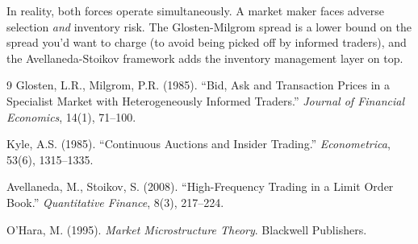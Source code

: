 \documentclass[11pt]{article}
\begin{document}
In reality, both forces operate simultaneously. A market maker faces adverse selection \emph{and} inventory risk. The Glosten-Milgrom spread is a lower bound on the spread you'd want to charge (to avoid being picked off by informed traders), and the Avellaneda-Stoikov framework adds the inventory management layer on top.

\begin{thebibliography}{9}
 Glosten, L.R., Milgrom, P.R. (1985). ``Bid, Ask and Transaction Prices in a Specialist Market with Heterogeneously Informed Traders.'' \textit{Journal of Financial Economics}, 14(1), 71--100.

 Kyle, A.S. (1985). ``Continuous Auctions and Insider Trading.'' \textit{Econometrica}, 53(6), 1315--1335.

 Avellaneda, M., Stoikov, S. (2008). ``High-Frequency Trading in a Limit Order Book.'' \textit{Quantitative Finance}, 8(3), 217--224.

 O'Hara, M. (1995). \textit{Market Microstructure Theory}. Blackwell Publishers.
\end{thebibliography}
\end{document}

